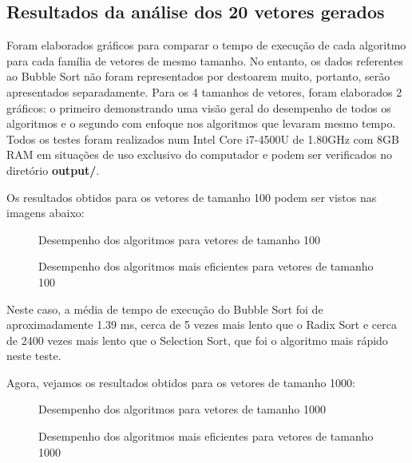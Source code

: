 \documentclass[12pt,a4paper]{article}
\begin{document}
\subsection{Resultados da análise dos 20 vetores gerados}
Foram elaborados gráficos para comparar o tempo de execução de cada algoritmo para cada família de vetores de mesmo tamanho. No entanto, os dados referentes ao Bubble Sort não foram representados por destoarem muito, portanto, serão apresentados separadamente. Para os 4 tamanhos de vetores, foram elaborados 2 gráficos: o primeiro demonstrando uma visão geral do desempenho de todos os algoritmos e o segundo com enfoque nos algoritmos que levaram mesmo tempo. Todos os testes foram realizados num Intel Core i7-4500U de 1.80GHz com 8GB RAM em situações de uso exclusivo do computador e podem ser verificados no diretório \textbf{output/}.

Os resultados obtidos para os vetores de tamanho 100 podem ser vistos nas imagens abaixo:
\begin{figure}[h]
	\centering
	\caption{Desempenho dos algoritmos para vetores de tamanho 100}
\end{figure}

\pagebreak

\begin{figure}[h]
	\centering
	\caption{Desempenho dos algoritmos mais eficientes para vetores de tamanho 100}
\end{figure}

Neste caso, a média de tempo de execução do Bubble Sort foi de aproximadamente 1.39 ms, cerca de 5 vezes mais lento que o Radix Sort e cerca de 2400 vezes mais lento que o Selection Sort, que foi o algoritmo mais rápido neste teste.

Agora, vejamos os resultados obtidos para os vetores de tamanho 1000:

\begin{figure}[h]
	\centering
	\caption{Desempenho dos algoritmos para vetores de tamanho 1000}
\end{figure}

\pagebreak

\begin{figure}[h]
	\centering
	\caption{Desempenho dos algoritmos mais eficientes para vetores de tamanho 1000}
\end{figure}
\end{document}
